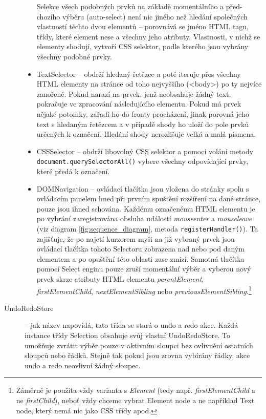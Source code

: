 \documentclass[thesis=B,czech]{FITthesis}[2012/06/26]
\begin{document}
\begin{description}
\begin{itemize}
		Selekce všech podobných prvků na základě momentálního a před-chozího výběru (auto-select) není nic jiného než hledání společných vlastností těchto dvou elementů -- porovnává se jméno HTML tagu, třídy, které element nese a všechny jeho atributy. Vlastnosti, v nichž se elementy shodují, vytvoří CSS selektor, podle kterého jsou vybrány všechny podobné prvky.
		\item TextSelector -- obdrží hledaný řetězec a poté iteruje přes všechny HTML elementy na stránce od toho nejvyššího (\textless \textsf{body}\textgreater) po ty nejvíce zanořené. Pokud narazí na prvek, jenž neobsahuje žádný text, pokračuje ve zpracování následujícího elementu. Pokud má prvek nějaké potomky, zařadí ho do fronty procházení, jinak porovná jeho text s hledaným řetězcem a v případě shody ho uloží do pole prvků určených k označení. Hledání shody nerozlišuje velká a malá písmena.
		\item CSSSelector -- obdrží libovolný CSS selektor a pomocí volání metody \verb|document.querySelectorAll()| vybere všechny odpovídající prvky, které předá k označení.
		\item DOMNavigation -- ovládací tlačítka jsou vložena do stránky spolu s ovládacím panelem hned při prvním spuštění rozšíření na dané stránce, pouze jsou ihned schována. Každému označenému HTML elementu je po vybrání zaregistrována obsluha událostí \emph{mouseenter} a \emph{mouseleave} (viz diagram \ref{fig:sequence_diagram}, metoda \verb|registerHandler()|). Ta zajišťuje, že po najetí kurzorem myši na již vybraný prvek jsou ovládací tlačítka tohoto Selectoru zobrazena nad nebo pod daným elementem a po opuštění této oblasti zase zmizí. Samotná tlačítka pomocí Select enginu pouze zruší momentální výběr a vyberou nový prvek skrze atributy HTML elementu \emph{parentElement}, \emph{firstElementChild}, \emph{nextElementSibling} nebo \emph{previousElementSibling}.\footnote{Záměrně je použita vždy varianta s \emph{Element} (tedy např. \emph{firstElementChild} a ne \emph{firstChild}), neboť vždy chceme vybrat Element node a ne například Text node, který nemá nic jako CSS třídy apod.}
	\end{itemize}

	\item[UndoRedoStore] -- jak název napovídá, tato třída se stará o undo a redo akce. Každá instance třídy Selection obsahuje svůj vlastní UndoRedoStore. To umožňuje zvrátit výběr pouze v aktivním sloupci bez ovlivnění ostatních sloupců nebo řádků. Stejně tak pokud jsou zrovna vybírány řádky, akce undo a redo neovlivní žádný sloupec.
	

\end{description}
\end{document}

